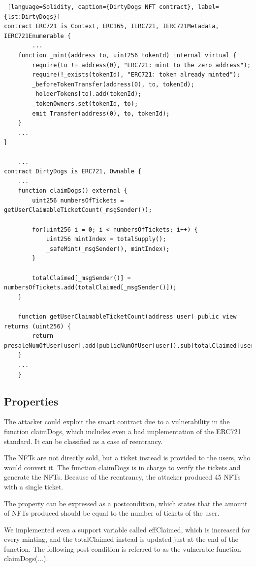     
\begin{lstlisting} [language=Solidity, caption={DirtyDogs NFT contract}, label={lst:DirtyDogs}]
contract ERC721 is Context, ERC165, IERC721, IERC721Metadata, IERC721Enumerable {
        ... 
    function _mint(address to, uint256 tokenId) internal virtual {
        require(to != address(0), "ERC721: mint to the zero address");
        require(!_exists(tokenId), "ERC721: token already minted");
        _beforeTokenTransfer(address(0), to, tokenId);
        _holderTokens[to].add(tokenId);
        _tokenOwners.set(tokenId, to);
        emit Transfer(address(0), to, tokenId);
    }
    ...
}
    
    ... 
contract DirtyDogs is ERC721, Ownable {
    ...
    function claimDogs() external {
        uint256 numbersOfTickets = getUserClaimableTicketCount(_msgSender());
        
        for(uint256 i = 0; i < numbersOfTickets; i++) {
            uint256 mintIndex = totalSupply();
            _safeMint(_msgSender(), mintIndex);
        }

        totalClaimed[_msgSender()] = numbersOfTickets.add(totalClaimed[_msgSender()]);
    }

    function getUserClaimableTicketCount(address user) public view returns (uint256) {
        return presaleNumOfUser[user].add(publicNumOfUser[user]).sub(totalClaimed[user]);
    }
    ...
    }
\end{lstlisting} 

\subsection{Properties}
\label{sec:DirtyDogs:Properties}
The attacker could exploit the smart contract due to a vulnerability in the function claimDogs, 
which includes even a bad implementation of the ERC721 standard. It can be classified as a case of reentrancy. 

The NFTs are not directly sold, but a ticket instead is provided to the users, who would convert it. The function claimDogs 
is in charge to verify the tickets and generate the NFTs. Because of the reentrancy, the attacker produced 45 NFTs with a single ticket.

The property can be expressed as a postcondition, which states that the amount of NFTs produced should be equal to the number of tickets of the user. 

We implemented even a support variable called effClaimed, which is increased for every minting, and the totalClaimed instead is updated just at the end of the function. 
The following post-condition is referred to as the vulnerable function claimDogs(...).

